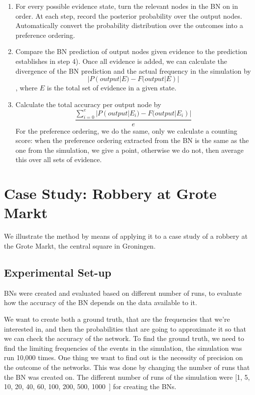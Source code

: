\documentclass[12pt]{article}
\begin{document}
\begin{enumerate}
\item For every possible evidence state, turn the relevant nodes in the BN on in order. At each step, record the posterior probability over the output nodes. Automatically convert the probability distribution over the outcomes into a preference ordering.
\item Compare the BN prediction of output nodes given evidence to the prediction establishes in step 4). Once all evidence is added, we can calculate the divergence of the BN prediction and the actual frequency in the simulation by \[|P(output|E) - F(output|E)|\], where $E$ is the total set of evidence in a given state.
\item Calculate the total accuracy per output node by \[\frac{\sum_{i=0}^{e}|P(output | E_i) - F(output| E_i)|}{e}\] For the preference ordering, we do the same, only we calculate a counting score: when the preference ordering extracted from the BN is the same as the one from the simulation, we give a point, otherwise we do not, then average this over all sets of evidence.
\end{enumerate}


\newpage


\section{Case Study: Robbery at Grote Markt}
We illustrate the method by means of applying it to a case study of a robbery at the Grote Markt, the central square in Groningen.

\subsection{Experimental Set-up}
BNs were created and evaluated based on different number of runs, to evaluate how the accuracy of the BN depends on the data available to it. 

We want to create both a ground truth, that are the frequencies that we're interested in, and then the probabilities that are going to approximate it so that we can check the accuracy of the network. To find the ground truth, we need to find the limiting frequencies of the events in the simulation, the simulation was run 10,000 times. One thing we want to find out is the necessity of precision on the outcome of the networks. This was done by changing the number of runs that the BN was created on. The different number of runs of the simulation were [1, 5, 10, 20, 40, 60, 100, 200, 500, 1000~] for creating the BNs.
\end{document}
